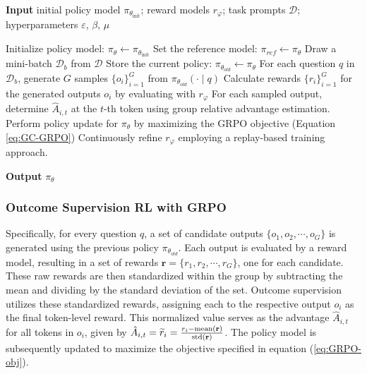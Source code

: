 \begin{itemize}[topsep=0pt]
\begin{itemize}[topsep=0pt]
\begin{algorithm}[t]
  \small
  \caption{Iterative Group Relative Policy Optimization}
  \textbf{Input} initial policy model $\pi_{\theta_{\text{init}}}$; reward models $r_\varphi$; task prompts $\mathcal{D}$; 
  hyperparameters $\varepsilon$, $\beta$, $\mu$
  \begin{algorithmic}[1]
    \State Initialize policy model: $\pi_\theta \gets \pi_{\theta_{\text{init}}}$
       \State Set the reference model: $\pi_{ref} \gets \pi_{\theta}$
      \State Draw a mini-batch $\mathcal{D}_b$ from $\mathcal{D}$
      \State Store the current policy: $\pi_{\theta_{old}} \gets \pi_{\theta}$ 
      \State For each question $q$ in $\mathcal{D}_b$, generate $G$ samples $\{o_i\}_{i=1}^G$ from $\pi_{\theta_{old}} (\cdot \mid q)$
      \State Calculate rewards $\{r_i\}_{i=1}^{G}$ for the generated outputs $o_i$ by evaluating with $r_\varphi$
      \State For each sampled output, determine $\hat{A}_{i,t}$ at the $t$-th token using group relative advantage estimation.
        \State Perform policy update for $\pi_{\theta}$ by maximizing the GRPO objective (Equation \ref{eq:GC-GRPO})
      \EndFor
    \EndFor 
    \State Continuously refine $r_\varphi$ employing a replay-based training approach.
    \EndFor 
  \end{algorithmic}
  \textbf{Output} $\pi_\theta$
  \label{alg:iter-grpo}
\end{algorithm}

\subsubsection{Outcome Supervision RL with GRPO} Specifically, for every question $q$, a set of candidate outputs $\{o_1, o_2, \cdots, o_G\}$ is generated using the previous policy $\pi_{\theta_{old}}$. Each output is evaluated by a reward model, resulting in a set of rewards $\mathbf{r}=\{r_1, r_2, \cdots, r_G\}$, one for each candidate. These raw rewards are then standardized within the group by subtracting the mean and dividing by the standard deviation of the set. Outcome supervision utilizes these standardized rewards, assigning each to the respective output $o_i$ as the final token-level reward. This normalized value serves as the advantage $\hat{A}_{i, t}$ for all tokens in $o_i$, given by $\hat{A}_{i, t} = \widetilde{r}_i = \frac{r_i- {\rm mean}(\mathbf{r})}{{\rm std}(\mathbf{r})}$. The policy model is subsequently updated to maximize the objective specified in equation (\ref{eq:GRPO-obj}).


\end{itemize}
\end{itemize}
